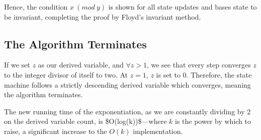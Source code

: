 \documentclass[letterpaper]{article}
\begin{document}
Hence, the condition \(x\ (mod\ y)\) is shown for all state updates and bases state to be invariant, completing the proof by Floyd's invariant method.

\subsection{The Algorithm Terminates}
\label{sec:org02ea279}
If we set \(z\) as our derived variable, and \(\forall z>1\), we see that every step converges \(z\) to the integer divisor of itself to two. At \(z=1\), \(z\) is set to \(0\). Therefore, the state machine follows a strictly descending derived variable which converges, meaning the algorithm terminates.

The new running time of the exponentiation, as we are constantly dividing by \(2\) on the derived variable count, is \$O(log(k))\$---where \(k\) is the power by which to raise, a significant increase to the \(O(k)\) implementation.
\end{document}
